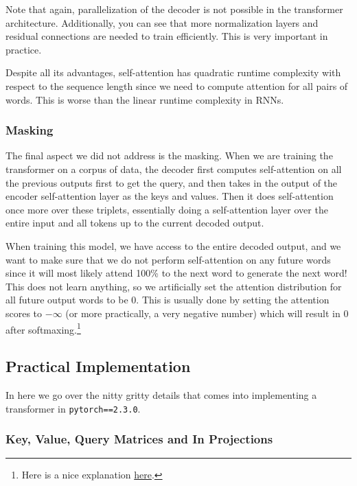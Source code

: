       Note that again, parallelization of the decoder is not possible in the transformer architecture. Additionally, you can see that more normalization layers and residual connections are needed to train efficiently. This is very important in practice. 

      Despite all its advantages, self-attention has quadratic runtime complexity with respect to the sequence length since we need to compute attention for all pairs of words. This is worse than the linear runtime complexity in RNNs.  

    \subsubsection{Masking}

      The final aspect we did not address is the masking. When we are training the transformer on a corpus of data, the decoder first computes self-attention on all the previous outputs first to get the query, and then takes in the output of the encoder self-attention layer as the keys and values. Then it does self-attention once more over these triplets, essentially doing a self-attention layer over the entire input and all tokens up to the current decoded output. 

      When training this model, we have access to the entire decoded output, and we want to make sure that we do not perform self-attention on any future words since it will most likely attend 100\% to the next word to generate the next word! This does not learn anything, so we artificially set the attention distribution for all future output words to be $0$. This is usually done by setting the attention scores to $-\infty$ (or more practically, a very negative number) which will result in $0$ after softmaxing.\footnote{Here is a nice explanation \href{https://stackoverflow.com/questions/58127059/how-to-understand-masked-multi-head-attention-in-transformer}{here}.}

  \subsection{Practical Implementation}

    In here we go over the nitty gritty details that comes into implementing a transformer in \texttt{pytorch==2.3.0}. 

    \subsubsection{Key, Value, Query Matrices and In Projections}

